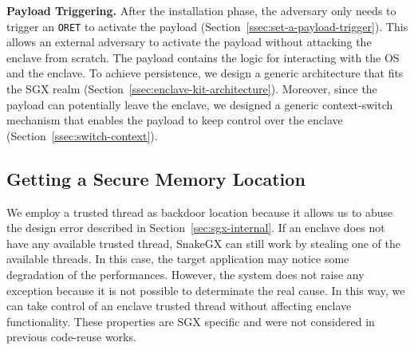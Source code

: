 \textbf{Payload Triggering.}
After the installation phase, the adversary only needs to trigger an
\texttt{ORET} to activate the payload 
(Section~\ref{ssec:set-a-payload-trigger}).
This allows an external adversary to activate the payload without attacking
the enclave from scratch.
The payload contains the logic for interacting with the OS and the 
enclave.
To achieve persistence, we design a generic architecture that fits the SGX
realm (Section~\ref{ssec:enclave-kit-architecture}).
Moreover, since the payload can potentially leave the  
enclave, we designed a generic context-switch mechanism that
enables the payload to keep control over the enclave 
(Section~\ref{ssec:switch-context}).

\subsection{Getting a Secure Memory Location}
\label{ssec:memory-location}

We employ a trusted
thread as backdoor location because it allows us to abuse the 
design error described in Section~\ref{sec:sgx-internal}.
If an enclave does not have any available trusted thread, 
SnakeGX can still work by stealing one of the available threads. In this 
case, the target application may notice some degradation of the performances. 
However, the system does not raise any exception because it is not possible to 
determinate the real cause.
In this way, we can take control of an enclave trusted thread without affecting 
enclave functionality.
These properties are SGX specific and were not considered in previous 
code-reuse works.

